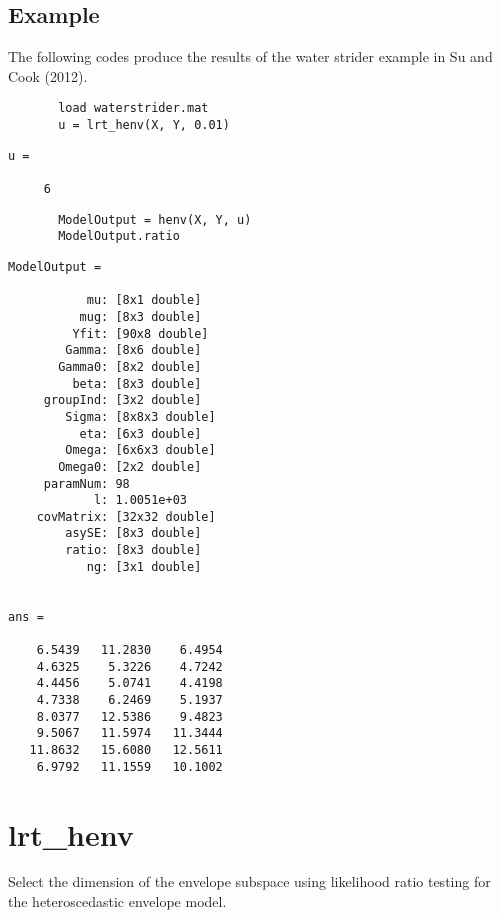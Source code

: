 \documentclass[a4paper,11pt,openany]{memoir}
\begin{document}
\subsection*{Example}

\begin{par}
The following codes produce the results of the water strider example in Su and Cook (2012).
\end{par} \vspace{1em}

\begin{verbatim}       load waterstrider.mat
       u = lrt_henv(X, Y, 0.01)
       \end{verbatim}
               \color{lightgray}\ttfamily \begin{verbatim}
u =

     6
\end{verbatim} \rmfamily
\color{black}
\begin{verbatim}       ModelOutput = henv(X, Y, u)
       ModelOutput.ratio\end{verbatim}

 \color{lightgray}\ttfamily \begin{verbatim}
ModelOutput = 

           mu: [8x1 double]
          mug: [8x3 double]
         Yfit: [90x8 double]
        Gamma: [8x6 double]
       Gamma0: [8x2 double]
         beta: [8x3 double]
     groupInd: [3x2 double]
        Sigma: [8x8x3 double]
          eta: [6x3 double]
        Omega: [6x6x3 double]
       Omega0: [2x2 double]
     paramNum: 98
            l: 1.0051e+03
    covMatrix: [32x32 double]
        asySE: [8x3 double]
        ratio: [8x3 double]
           ng: [3x1 double]


ans =

    6.5439   11.2830    6.4954
    4.6325    5.3226    4.7242
    4.4456    5.0741    4.4198
    4.7338    6.2469    5.1937
    8.0377   12.5386    9.4823
    9.5067   11.5974   11.3444
   11.8632   15.6080   12.5611
    6.9792   11.1559   10.1002

\end{verbatim} \rmfamily
\color{black}
    
\newpage
    
\rmfamily
\color{black}\section{lrt\_henv}

\begin{par}
Select the dimension of the envelope subspace using likelihood ratio testing for the heteroscedastic envelope model.
\end{par} \vspace{1em}
\end{document}
